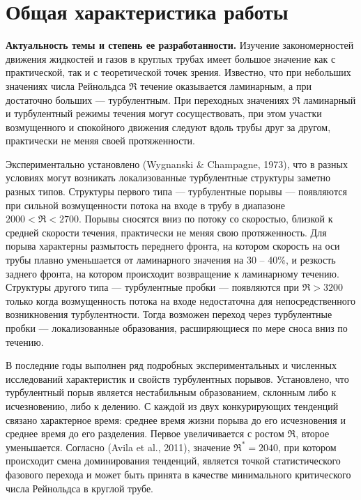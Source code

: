 \nocite{Vest18, MZG2017, MZG2015, Kazan2015, KMU2016, KMU2015, KMU2014} %
\nocite{Lomonosov2018, Lomonosov2017, Lomonosov2016, Lomonosov2015, Lomonosov2014, LomRead2017, LomRead2016, LomRead2014, NeZaTeGiUs2016, NeZaTeGiUs2014, Bur2016, Bur2014, Ob2018, ICMAR2016, Kazan2015conf}

\section*{\centering  Общая характеристика работы}

\textbf{Актуальность темы и степень ее разработанности.}
Изучение закономерностей движения жидкостей и газов в круглых трубах имеет большое значение как с практической, так и с теоретической точек зрения. Известно, что при небольших значениях числа Рейнольдса $\Re$ течение оказывается ламинарным, а при достаточно больших --- турбулентным. При переходных значениях $\Re$ ламинарный и турбулентный режимы течения могут сосуществовать, при этом участки возмущенного и спокойного движения следуют вдоль трубы друг за другом, практически не меняя своей протяженности. 

Экспериментально установлено (Wygnanski \& Champagne, 1973), что в разных условиях могут возникать локализованные турбулентные структуры заметно разных типов. Структуры первого типа --- турбулентные порывы --- появляются при сильной возмущенности потока на входе в трубу в диапазоне $2000<\Re<2700$. Порывы сносятся вниз по потоку со скоростью, близкой к средней скорости течения, практически не меняя свою протяженность. Для порыва характерны размытость переднего фронта, на котором скорость на оси трубы плавно уменьшается от ламинарного значения на 30 -- 40\%, и резкость заднего фронта, на котором происходит возвращение к ламинарному течению. Структуры другого типа --- турбулентные пробки --- появляются при $\Re>3200$ только когда возмущенность потока на входе недостаточна для непосредственного возникновения турбулентности. Тогда возможен переход через турбулентные пробки --- локализованные образования, расширяющиеся по мере сноса вниз по течению. 

В последние годы выполнен ряд подробных экспериментальных и численных исследований характеристик и свойств турбулентных порывов. Установлено, что турбулентный порыв является нестабильным образованием, склонным либо к исчезновению, либо к делению. С каждой из двух конкурирующих тенденций связано характерное время: среднее время жизни порыва до его исчезновения и среднее время до его разделения. Первое увеличивается с ростом $\Re$, второе уменьшается. Согласно (Avila et al., 2011), значение $\Re^*=2040$, при котором происходит смена доминирования тенденций, является точкой статистического фазового перехода и может быть принята в качестве минимального критического числа Рейнольдса в круглой трубе. 

